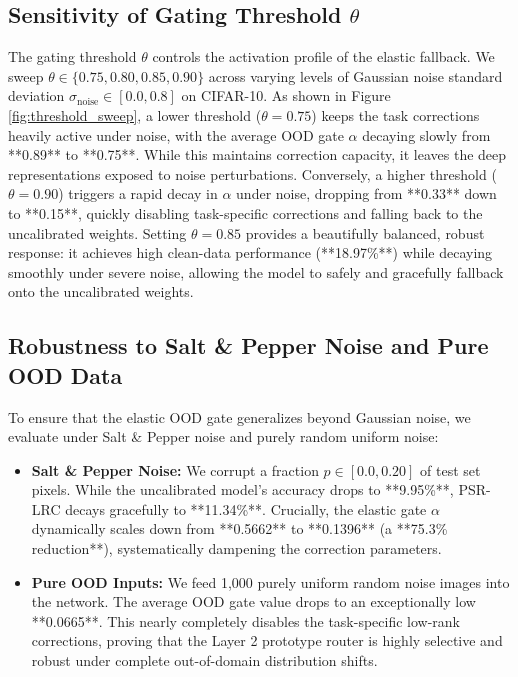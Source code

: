 \documentclass{article}
\theoremstyle{plain}
\theoremstyle{definition}
\theoremstyle{remark}
\begin{document}
\subsection{Sensitivity of Gating Threshold $\theta$}
The gating threshold $\theta$ controls the activation profile of the elastic fallback. We sweep $\theta \in \{0.75, 0.80, 0.85, 0.90\}$ across varying levels of Gaussian noise standard deviation $\sigma_{\text{noise}} \in [0.0, 0.8]$ on CIFAR-10.
As shown in Figure \ref{fig:threshold_sweep}, a lower threshold ($\theta=0.75$) keeps the task corrections heavily active under noise, with the average OOD gate $\alpha$ decaying slowly from **0.89** to **0.75**. While this maintains correction capacity, it leaves the deep representations exposed to noise perturbations.
Conversely, a higher threshold ($\theta=0.90$) triggers a rapid decay in $\alpha$ under noise, dropping from **0.33** down to **0.15**, quickly disabling task-specific corrections and falling back to the uncalibrated weights.
Setting $\theta = 0.85$ provides a beautifully balanced, robust response: it achieves high clean-data performance (**18.97\%**) while decaying smoothly under severe noise, allowing the model to safely and gracefully fallback onto the uncalibrated weights.

\subsection{Robustness to Salt \& Pepper Noise and Pure OOD Data}
To ensure that the elastic OOD gate generalizes beyond Gaussian noise, we evaluate under Salt \& Pepper noise and purely random uniform noise:
\begin{itemize}
    \item \textbf{Salt \& Pepper Noise:} We corrupt a fraction $p \in [0.0, 0.20]$ of test set pixels. While the uncalibrated model's accuracy drops to **9.95\%**, PSR-LRC decays gracefully to **11.34\%**. Crucially, the elastic gate $\alpha$ dynamically scales down from **0.5662** to **0.1396** (a **75.3\% reduction**), systematically dampening the correction parameters.
    \item \textbf{Pure OOD Inputs:} We feed 1,000 purely uniform random noise images into the network. The average OOD gate value drops to an exceptionally low **0.0665**. This nearly completely disables the task-specific low-rank corrections, proving that the Layer 2 prototype router is highly selective and robust under complete out-of-domain distribution shifts.
\end{itemize}
\end{document}
